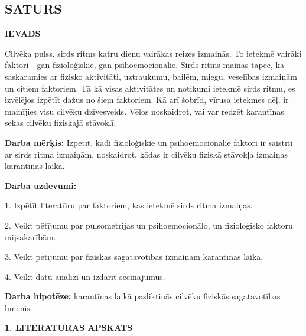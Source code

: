\documentclass[12pt]{article}
\begin{document}
\newpage
\begin{titlepage}

\section*{\centering\textbf{SATURS}}
\def\contentsname{\empty}
\tableofcontents



\end{titlepage}

\newpage
\begin{titlepage}
\begin{center}
\fontsize{14}{}\selectfont\textbf{IEVADS}
\end{center}

Cilvēka pulss, sirds ritms katru dienu vairākas reizes izmainās. To ietekmē vairāki faktori - gan fizioloģiskie, gan psihoemocionālie. Sirds ritms mainās tāpēc, ka saskaramies ar fizisko aktivitāti, uztraukumu, bailēm, miegu, veselības izmaiņām un citiem faktoriem. Tā kā visas aktivitātes un notikumi ietekmē sirds ritmu, es izvēlējos izpētīt dažus no šiem faktoriem. Kā arī šobrīd, vīrusa ietekmes dēļ, ir mainījies visu cilvēku dzīvesveids. Vēlos noskaidrot, vai var redzēt karantīnas sekas cilvēku fiziskajā stāvoklī.

\textbf{Darba mērķis:} Izpētīt, kādi fizioloģiskie un psihoemocionālie faktori ir saistīti ar sirds ritma izmaiņām, noskaidrot, kādas ir cilvēku fiziskā stāvokļa izmaiņas karantīnas laikā. \par
\textbf{Darba uzdevumi:} \par
1.	Izpētīt literatūru par faktoriem, kas ietekmē sirds ritma izmaiņas. \par
2.	Veikt pētījumu par pulsometrijas un psihoemocionālo, un fizioloģisko faktoru mijsakarībām. \par
3.	Veikt pētījumu par fiziskās sagatavotības izmaiņām karantīnas laikā. \par
4.	Veikt datu analīzi un izdarīt secinājumus. \par
\textbf{Darba hipotēze:} karantīnas laikā pasliktinās cilvēku fiziskās sagatavotības līmenis.

\end{titlepage}
\newpage

\pagestyle{fancy}
\fancyhf{}
\rfoot{\thepage}
\setcounter{page}{5}

\begin{center}
\fontsize{14}{}\selectfont\textbf{1. LITERATŪRAS APSKATS}
\end{center}
\end{document}
